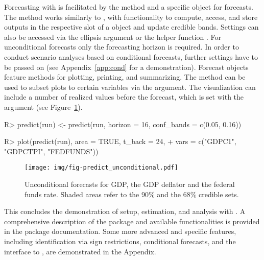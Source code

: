 \documentclass[article,nojss]{jss} %
\begin{document}
Forecasting with  is facilitated by the  method and a specific object for forecasts.
The method works similarly to , with functionality to compute, access, and store outputs in the respective slot of a  object and update credible bands.
Settings can also be accessed via the ellipsis argument or the helper function . For unconditional forecasts only the forecasting horizon is required. In order to conduct scenario analyses based on conditional forecasts, further settings have to be passed on (see Appendix~\ref{app:cond} for a demonstration).
Forecast objects feature methods for plotting, printing, and summarizing. The  method can be used to subset plots to certain variables via the  argument. The visualization can include a number of realized values before the forecast, which is set with the argument  (see Figure~\ref{fig:predict_unconditional}).

\begin{Schunk}
\begin{Sinput}
R> predict(run) <- predict(run, horizon = 16, conf_bands = c(0.05, 0.16))
\end{Sinput}
\end{Schunk}
\begin{Schunk}
\begin{Sinput}
R> plot(predict(run), area = TRUE, t_back = 24,
+    vars = c("GDPC1", "GDPCTPI", "FEDFUNDS"))
\end{Sinput}
\end{Schunk}

\begin{figure}[ht]
  \centering
  \texttt{[image: img/fig-predict\_unconditional.pdf]}
  \caption{Unconditional forecasts for GDP, the GDP deflator and the federal funds rate. Shaded areas refer to the 90\% and the 68\% credible sets.}
  \label{fig:predict_unconditional}
\end{figure}

This concludes the demonstration of setup, estimation, and analysis with . A comprehensive description of the package and available functionalities is provided in the package documentation. Some more advanced and specific features, including identification via sign restrictions, conditional forecasts, and the interface to , are demonstrated in the Appendix.


\end{document}
